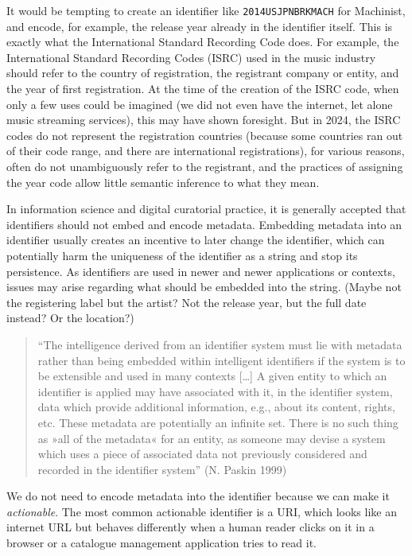 \documentclass[
  letterpaper,
  DIV=11,
  numbers=noendperiod]{scrreprt}
\begin{document}
It would be tempting to create an identifier like
\texttt{2014USJPNBRKMACH} for Machinist, and encode, for example, the
release year already in the identifier itself. This is exactly what the
International Standard Recording Code does. For example, the
International Standard Recording Codes (ISRC) used in the music industry
should refer to the country of registration, the registrant company or
entity, and the year of first registration. At the time of the creation
of the ISRC code, when only a few uses could be imagined (we did not
even have the internet, let alone music streaming services), this may
have shown foresight. But in 2024, the ISRC codes do not represent the
registration countries (because some countries ran out of their code
range, and there are international registrations), for various reasons,
often do not unambiguously refer to the registrant, and the practices of
assigning the year code allow little semantic inference to what they
mean.

In information science and digital curatorial practice, it is generally
accepted that identifiers should not embed and encode metadata.
Embedding metadata into an identifier usually creates an incentive to
later change the identifier, which can potentially harm the uniqueness
of the identifier as a string and stop its persistence. As identifiers
are used in newer and newer applications or contexts, issues may arise
regarding what should be embedded into the string. (Maybe not the
registering label but the artist? Not the release year, but the full
date instead? Or the location?)

\begin{quote}
``The intelligence derived from an identifier system must lie with
metadata rather than being embedded within intelligent identifiers if
the system is to be extensible and used in many contexts {[}\ldots{]} A
given entity to which an identifier is applied may have associated with
it, in the identifier system, data which provide additional information,
e.g., about its content, rights, etc. These metadata are potentially an
infinite set. There is no such thing as »all of the metadata« for an
entity, as someone may devise a system which uses a piece of associated
data not previously considered and recorded in the identifier system''
(N. Paskin 1999)
\end{quote}

We do not need to encode metadata into the identifier because we can
make it \emph{actionable}. The most common actionable identifier is a
URI, which looks like an internet URL but behaves differently when a
human reader clicks on it in a browser or a catalogue management
application tries to read it.
\end{document}
